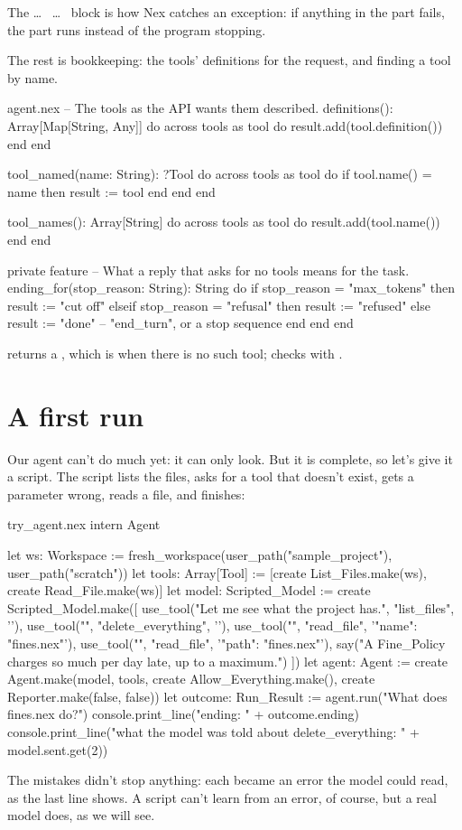 The  \ldots\  \ldots\  block is how Nex
catches an exception: if anything in the  part fails, the
 part runs instead of the program stopping.

The rest is bookkeeping: the tools' definitions for the request, and
finding a tool by name.

\begin{continued}{agent.nex}
  -- The tools as the API wants them described.
  definitions(): Array[Map[String, Any]] do
    across tools as tool do
      result.add(tool.definition())
    end
  end

  tool_named(name: String): ?Tool do
    across tools as tool do
      if tool.name() = name then
        result := tool
      end
    end
  end

  tool_names(): Array[String] do
    across tools as tool do
      result.add(tool.name())
    end
  end

  private feature
    -- What a reply that asks for no tools means for the task.
    ending_for(stop_reason: String): String do
      if stop_reason = "max_tokens" then
        result := "cut off"
      elseif stop_reason = "refusal" then
        result := "refused"
      else
        result := "done"     -- "end_turn", or a stop sequence
      end
    end
end
\end{continued}

 returns a , which is  when there is
no such tool;  checks with .

\section{A first run}

Our agent can't do much yet: it can only look. But it is complete, so
let's give it a script. The script lists the files, asks for a tool that
doesn't exist, gets a parameter wrong, reads a file, and finishes:

\begin{tryit}{try_agent.nex}
intern Agent

let ws: Workspace := fresh_workspace(user_path("sample_project"), user_path("scratch"))
let tools: Array[Tool] := [create List_Files.make(ws), create Read_File.make(ws)]
let model: Scripted_Model := create Scripted_Model.make([
  use_tool("Let me see what the project has.", "list_files", '{}'),
  use_tool("", "delete_everything", '{}'),
  use_tool("", "read_file", '{"name": "fines.nex"}'),
  use_tool("", "read_file", '{"path": "fines.nex"}'),
  say("A Fine_Policy charges so much per day late, up to a maximum.")
])
let agent: Agent := create Agent.make(model, tools, create Allow_Everything.make(),
  create Reporter.make(false, false))
let outcome: Run_Result := agent.run("What does fines.nex do?")
console.print_line("ending: " + outcome.ending)
console.print_line("what the model was told about delete_everything: " + model.sent.get(2))
\end{tryit}

The mistakes didn't stop anything: each became an error the model could
read, as the last line shows. A script can't learn from an error, of
course, but a real model does, as we will see.
